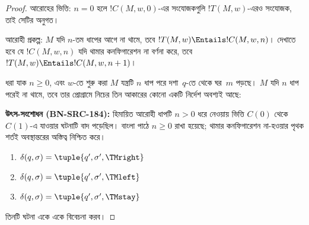 \documentclass[../../../include/open-logic-section]{subfiles}
\begin{document}
\begin{proof}
আরোহের ভিত্তি: $n=0$ হলে $!C(M,w,0)$-এর সংযোজকগুলি
$!T(M,w)$-এরও সংযোজক, তাই সেটির অনুগত।

আরোহী প্রকল্প: $M$ যদি $n$-তম ধাপের আগে না থামে, তবে
$!T(M,w)\Entails !C(M,w,n)$। দেখাতে হবে যে $!C(M,w,n)$ যদি থামার
কনফিগারেশন না বর্ণনা করে, তবে
$!T(M,w)\Entails !C(M,w,n+1)$।

ধরা যাক $n\ge 0$, এবং $w$-তে শুরু করা $M$ যন্ত্রটি $n$ ধাপ পরে
দশা~$q$-তে থেকে ঘর~$m$ পড়ছে। $M$ যদি $n$ ধাপ পরেই না থামে, তবে তার
প্রোগ্রামে নিচের তিন আকারের কোনো একটি নির্দেশ অবশ্যই আছে:
\par\smallskip\noindent\textnormal{\small\textbf{উৎস-সংশোধন (BN-SRC-184):} হিমায়িত আরোহী ধাপটি $n>0$ ধরে নেওয়ায় ভিত্তি $C(0)$ থেকে $C(1)$-এ যাওয়ার ঘটনাটি বাদ পড়েছিল। বাংলা পাঠে $n\ge 0$ রাখা হয়েছে; থামার কনফিগারেশন না-হওয়ার পৃথক শর্তই অবস্থান্তরের অস্তিত্ব নিশ্চিত করে।} %

\begin{enumerate}
\item {} $\delta(q,\sigma)=\tuple{q',\sigma',\TMright}$

\item {} $\delta(q,\sigma)=\tuple{q',\sigma',\TMleft}$

\item {} $\delta(q,\sigma)=\tuple{q',\sigma',\TMstay}$
\end{enumerate}

তিনটি ঘটনা একে একে বিবেচনা করব।


\end{proof}
\end{document}
